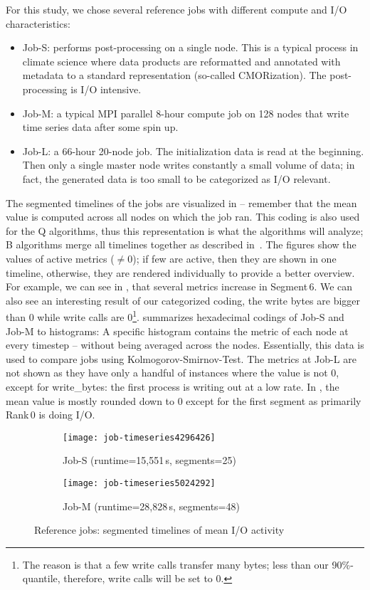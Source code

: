 \documentclass{jhps}
\begin{document}
For this study, we chose several reference jobs with different compute and I/O characteristics:
\begin{itemize}
	\item Job-S: performs post-processing on a single node. This is a typical process in climate science where data products are reformatted and annotated with metadata to a standard representation (so-called CMORization). The post-processing is I/O intensive.
  \item Job-M: a typical MPI parallel 8-hour compute job on 128 nodes that write time series data after some spin up.   %
	\item Job-L: a 66-hour 20-node job.
  The initialization data is read at the beginning.
  Then only a single master node writes constantly a small volume of data; in fact, the generated data is too small to be categorized as I/O relevant.
\end{itemize}

The segmented timelines of the jobs are visualized in  -- remember that the mean value is computed across all nodes on which the job ran.
This coding is also used for the Q algorithms, thus this representation is what the algorithms will analyze; B algorithms merge all timelines together as described in~\cite{Eugen20HPS}.
The figures show the values of active metrics ($\neq 0$); if few are active, then they are shown in one timeline, otherwise, they are rendered individually to provide a better overview.
For example, we can see in , that several metrics increase in Segment\,6. 
We can also see an interesting result of our categorized coding, the write bytes are bigger than 0 while write calls are 0\footnote{The reason is that a few write calls transfer many bytes; less than our 90\%-quantile, therefore, write calls will be set to 0.}.
 summarizes hexadecimal codings of Job-S and Job-M to histograms:
A specific histogram contains the metric of each node at every timestep -- without being averaged across the nodes.
Essentially, this data is used to compare jobs using Kolmogorov-Smirnov-Test.
The metrics at Job-L are not shown as they have only a handful of instances where the value is not 0, except for write\_bytes: the first process is writing out at a low rate.
In , the mean value is mostly rounded down to 0 except for the first segment as primarily Rank\,0 is doing I/O.

\begin{figure}
\begin{subfigure}{0.8\textwidth}
\centering
\texttt{[image: job-timeseries4296426]}
\caption{Job-S (runtime=15,551\,s, segments=25)}\label{fig:job-S}
\end{subfigure}
\centering


\begin{subfigure}{0.8\textwidth}
\centering
\texttt{[image: job-timeseries5024292]}
\caption{Job-M (runtime=28,828\,s, segments=48)}\label{fig:job-M}
\end{subfigure}
\centering


\caption{Reference jobs: segmented timelines of mean I/O activity}%
\label{fig:refJobs}
\end{figure}
\end{document}
